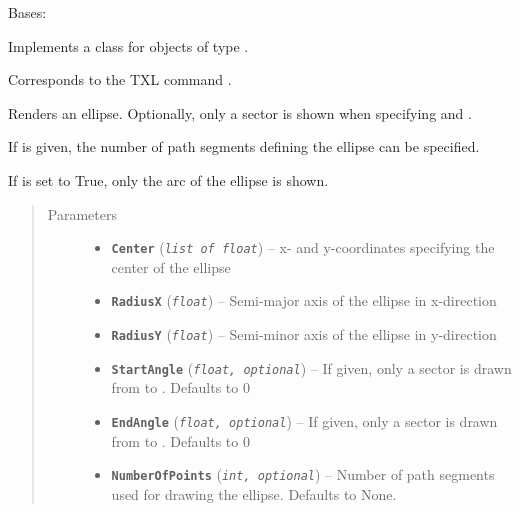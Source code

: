 \documentclass[letterpaper,10pt,english]{sphinxmanual}
\begin{document}
\begin{fulllineitems}
\label{Chapters/PythonModuleReference/Patterns/TXLWizard.Patterns.Ellipse:TXLWizard.Patterns.Ellipse.Ellipse}
Bases: {\hyperref[Chapters/PythonModuleReference/Patterns/TXLWizard.Patterns.AbstractPattern:TXLWizard.Patterns.AbstractPattern.AbstractPattern]{}}

Implements a class for  objects of type .

Corresponds to the TXL command .

Renders an ellipse. Optionally, only a sector is shown when specifying  and .

If  is given, the number of path segments defining the ellipse can be specified.

If  is set to True, only the arc of the ellipse is shown.
\begin{quote}\begin{description}
\item[{Parameters}] \leavevmode\begin{itemize}
\item {} 
\textbf{\texttt{Center}} (\emph{\texttt{list of float}}) -- x- and y-coordinates specifying the center of the ellipse

\item {} 
\textbf{\texttt{RadiusX}} (\emph{\texttt{float}}) -- Semi-major axis of the ellipse in x-direction

\item {} 
\textbf{\texttt{RadiusY}} (\emph{\texttt{float}}) -- Semi-minor axis of the ellipse in y-direction

\item {} 
\textbf{\texttt{StartAngle}} (\emph{\texttt{float, optional}}) -- If given, only a sector is drawn from  to .
Defaults to 0

\item {} 
\textbf{\texttt{EndAngle}} (\emph{\texttt{float, optional}}) -- If given, only a sector is drawn from  to .
Defaults to 0

\item {} 
\textbf{\texttt{NumberOfPoints}} (\emph{\texttt{int, optional}}) -- Number of path segments used for drawing the ellipse.
Defaults to None.


\end{itemize}
\end{description}
\end{quote}
\end{fulllineitems}
\end{document}
